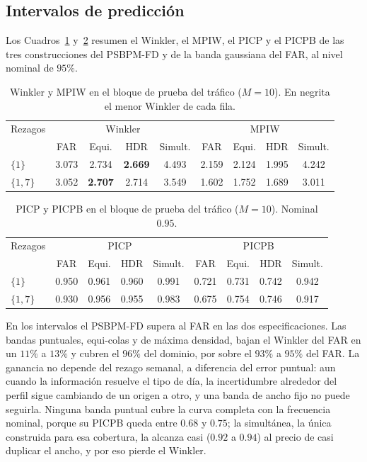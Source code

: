 \subsection{Intervalos de predicción}
\label{04_03_02_intervalos}

Los Cuadros~\ref{tab:apl_bloqueB_winkler} y~\ref{tab:apl_bloqueB_picp} resumen el Winkler, el MPIW, el PICP y el PICPB de las tres construcciones del PSBPM-FD y de la banda gaussiana del FAR, al nivel nominal de $95\%$.

\begin{table}[H]
\centering\small
\setlength{\tabcolsep}{3.5pt}
\caption{Winkler y MPIW en el bloque de prueba del tráfico ($M = 10$). En negrita el menor Winkler de cada fila.}
\label{tab:apl_bloqueB_winkler}
\begin{tabular}{l cccc cccc}
\hline
Rezagos & \multicolumn{4}{c}{Winkler} & \multicolumn{4}{c}{MPIW} \\
 & FAR & Equi. & HDR & Simult. & FAR & Equi. & HDR & Simult. \\
\hline
$\{1\}$ & 3.073 & 2.734 & \textbf{2.669} & 4.493 & 2.159 & 2.124 & 1.995 & 4.242 \\
$\{1,7\}$ & 3.052 & \textbf{2.707} & 2.714 & 3.549 & 1.602 & 1.752 & 1.689 & 3.011 \\
\hline
\end{tabular}
\end{table}

\begin{table}[H]
\centering\small
\setlength{\tabcolsep}{3.5pt}
\caption{PICP y PICPB en el bloque de prueba del tráfico ($M = 10$). Nominal $0.95$.}
\label{tab:apl_bloqueB_picp}
\begin{tabular}{l cccc cccc}
\hline
Rezagos & \multicolumn{4}{c}{PICP} & \multicolumn{4}{c}{PICPB} \\
 & FAR & Equi. & HDR & Simult. & FAR & Equi. & HDR & Simult. \\
\hline
$\{1\}$ & 0.950 & 0.961 & 0.960 & 0.991 & 0.721 & 0.731 & 0.742 & 0.942 \\
$\{1,7\}$ & 0.930 & 0.956 & 0.955 & 0.983 & 0.675 & 0.754 & 0.746 & 0.917 \\
\hline
\end{tabular}
\end{table}

En los intervalos el PSBPM-FD supera al FAR en las dos especificaciones. Las bandas puntuales, equi-colas y de máxima densidad, bajan el Winkler del FAR en un $11\%$ a $13\%$ y cubren el $96\%$ del dominio, por sobre el $93\%$ a $95\%$ del FAR. La ganancia no depende del rezago semanal, a diferencia del error puntual: aun cuando la información resuelve el tipo de día, la incertidumbre alrededor del perfil sigue cambiando de un origen a otro, y una banda de ancho fijo no puede seguirla. Ninguna banda puntual cubre la curva completa con la frecuencia nominal, porque su PICPB queda entre $0.68$ y $0.75$; la simultánea, la única construida para esa cobertura, la alcanza casi ($0.92$ a $0.94$) al precio de casi duplicar el ancho, y por eso pierde el Winkler.

